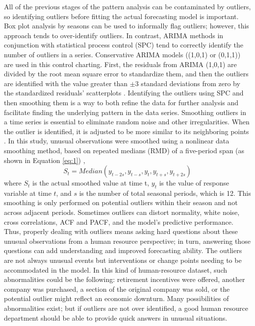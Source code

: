 All of the previous stages of the pattern analysis can be contaminated by outliers, so identifying outliers before fitting the actual forecasting model is important. Box plot analysis by seasons can be used to informally flag outliers; however, this approach tends to over-identify outliers. In contrast, ARIMA methods in conjunction with statistical process control (SPC) tend to correctly identify the number of outliers in a series. Conservative ARIMA models ((1,0,1) or (0,1,1)) are used in this control charting. First, the residuals from ARIMA (1,0,1) are divided by the root mean square error to standardize them, and then the outliers are identified with the value greater than $\pm3$ standard deviations from zero by the standardized residuals' scatterplots  \citep{alwan1988, grznar1997}.
Identifying the outliers using SPC and then smoothing them is a way to both refine the data for further analysis and facilitate finding the underlying pattern in the data series. Smoothing outliers in a time series is essential  to eliminate  random noise and other irregularities. When the outlier is identified, it is adjusted to be more similar to its neighboring points \citep{grznar1997}. In this study, unusual observations were smoothed using a nonlinear data smoothing method, based on repeated medians (RMD) of a five-period span (as shown in Equation \ref{eq:1}) \citep{velleman1980},
\begin{equation} \label{eq:1}
	S_t=Median(y_{t-2s},y_{t-s},y_t,y_{t+s},y_{t+2s} ) 
\end{equation}
where $S_t$ is the actual smoothed value at time t, $y_t$ is the value of response variable at time $t$, and $s$ is the number of total seasonal periods, which is 12. This smoothing is only performed on potential outliers within their season and not across adjacent periods. Sometimes outliers can distort normality, white noise, cross correlations, ACF and PACF, and the model's predictive performance. Thus, properly dealing with outliers means asking hard questions about these unusual observations from a human resource perspective; in turn, answering those questions can add understanding and improved forecasting ability.    The outliers are not always unusual events but interventions or change points needing  to be accommodated in the model.  In this kind of human-resource dataset, such abnormalities could be the following: retirement incentives were offered, another company was purchased, a section of the original company was sold, or the potential outlier might reflect an economic downturn.  Many possibilities of abnormalities exist; but if outliers are not over identified, a good human resource department should be able to provide quick answers in unusual situations.
